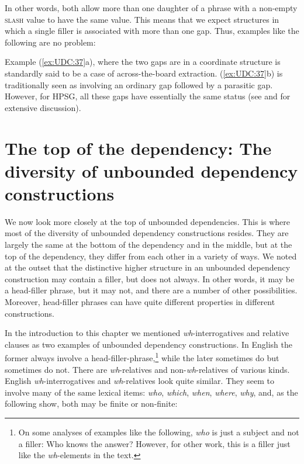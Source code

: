 \documentclass[output=paper
                ,modfonts
                ,nonflat
	        ,collection
	        ,collectionchapter
	        ,collectiontoclongg
 	        ,biblatex
                ,babelshorthands
                ,newtxmath
                ,draftmode
                ,colorlinks, citecolor=brown
]{./langsci/langscibook}
\begin{document}
{\noindent
In other words, both allow more than one daughter of a phrase with a
non-empty \textsc{slash} value to have the same value. This means that we expect
structures in which a single filler is associated with more than one
gap. Thus, examples like the following are no problem:

\begin{exe} \ex \begin{xlist} \label{ex:UDC:37}

\end{xlist}
\end{exe}

\noindent
Example (\ref{ex:UDC:37}a), where the two gaps are in a coordinate structure
is standardly said to be a case of across-the-board
extraction. (\ref{ex:UDC:37}b) is traditionally seen as involving an
ordinary gap followed by a parasitic gap. However, for HPSG, all these
gaps have essentially the same status (see \citealt{Levine:Hukari:06}
and \citealt{Chaves:12} for extensive discussion).

\section{The top of the dependency: The diversity of unbounded
dependency constructions}
\label{sec:UDC:Top}

We now look more closely at the top of unbounded dependencies. This is
where most of the diversity of unbounded dependency constructions
resides. They are largely the same at the bottom of the dependency and
in the middle, but at the top of the dependency, they differ from each
other in a variety of ways. We noted at the outset that the
distinctive higher structure in an unbounded dependency construction
may contain a filler, but does not always. In other words, it may be a
head-filler phrase, but it may not, and there are a number of other
possibilities. Moreover, head-filler phrases can have quite different
properties in different constructions.

In the introduction to this chapter we mentioned
\emph{wh}-interrogatives and relative clauses as two examples of
unbounded dependency constructions. In English the former always involve
a head-filler-phrase,\footnote{On some analyses of examples like the
  following, \emph{who} is just a subject and not a filler:
\ea
Who knows the answer?
\z
However, for other work, this is a filler just like the
  \emph{wh}-elements in the text.} while the later sometimes do but
sometimes do not. There are \emph{wh}-relatives and
non-\emph{wh}-relatives of various kinds. English
\emph{wh}-interrogatives and \emph{wh}-relatives look quite similar.
They seem to involve many of the same lexical items: \emph{who},
\emph{which}, \emph{when}, \emph{where}, \emph{why}, and, as the
following show, both may be finite or non-finite:

}
\end{document}
